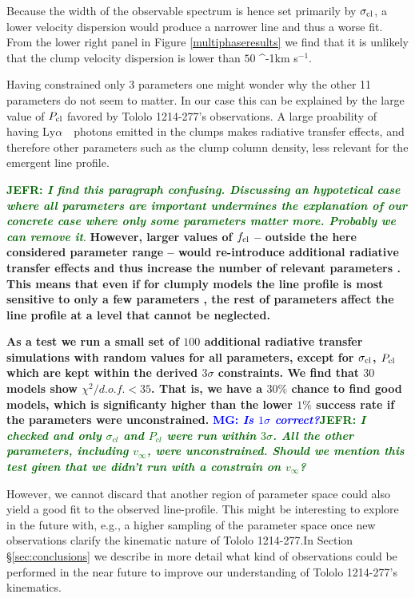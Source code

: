 \documentclass[a4,useAMS,usenatbib,usegraphicx]{mn2e}
\newcommand{\tol}{Tololo 1214-277}
\newcommand{\lya}{\ifmmode{{\rm Ly}\alpha}\else Ly$\alpha$\ \fi}
\newcommand{\kms}{\ifmmode\mathrm{km\ s}^{-1}\else km s$^{-1}$\fi}
\newcommand{\mg}[1]{\textcolor{blue}{\bf MG: \textit{#1}}}
\newcommand{\jefr}[1]{\textcolor{darkgreen}{\bf JEFR: \textit{#1}}}
\begin{document}
Because the width of the observable spectrum is hence set primarily by
$\sigma_{\rm cl}$, a lower velocity dispersion would produce a
narrower line and thus a worse fit. 
From the lower right panel in Figure \ref{multiphaseresults} we find that it
is unlikely that the clump velocity dispersion is lower than
$50$ \kms. 

Having constrained only 3 parameters one might wonder why the other 11
parameters do not seem to matter.
In our case this can be explained by the large value of $P_{\rm cl}$
favored by \tol's observations. 
A large proability of having \lya\ photons emitted in the clumps
makes radiative transfer effects, and therefore other parameters such
as the clump column density, less relevant for the emergent line
profile. 


\jefr{I find this paragraph confusing. Discussing an hypotetical case where
all parameters are important undermines the explanation of our concrete case
where only some parameters matter more. Probably we can remove it}.
{\bf However, larger values of $f_{\rm cl}$ -- outside the here considered parameter range -- would re-introduce
additional radiative transfer effects and thus increase the number of
relevant parameters \citep[see ][for details]{2017arXiv170406278G}.   
This means that even  
if for clumply models the line profile is most sensitive to only
a few parameters \citep{Gronke2016}, the rest of parameters
affect the line profile at a level that cannot be neglected.}

{\bf As a test we run a small set of $100$ additional radiative
transfer simulations with random values for all parameters, except for
$\sigma_{\rm cl}$, $P_{\rm cl}$ which are kept within the derived $3\sigma$
constraints. We find that $30$ models show $\chi^2/d.o.f.<35$.
That is, we have a $30\%$ chance to find good models, which is
significanty higher than the lower $1\%$ success rate if the
parameters were unconstrained.  }
\mg{Is $1\sigma$ correct?}\jefr{I checked and only $\sigma_{cl}$ and
  $P_{cl}$ were run within $3\sigma$. All the other parameters,
  including $v_{\infty}$, were
  unconstrained. Should we mention this test given that we didn't run
  with a constrain on $v_{\infty}$?} 

However, we cannot discard that another region of parameter space
could also yield a good fit to the observed line-profile.
This might be interesting to explore in the
future with, e.g., a higher sampling of the parameter space once new 
observations  clarify the kinematic nature of \tol.In
  Section \S \ref{sec:conclusions} we describe  in more detail what
  kind of observations could be performed in the near future to
  improve our understanding of \tol's kinematics.
\end{document}
